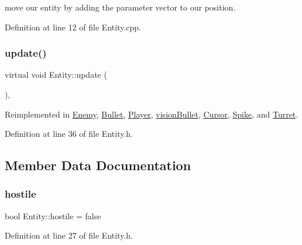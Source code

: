 move our entity by adding the parameter vector to our position. 



Definition at line 12 of file Entity.\+cpp.

\mbox{\label{class_entity_aed73e98b980b85833428c935cc1c69f8}} 
\subsubsection{\texorpdfstring{update()}{update()}}
{\footnotesize\ttfamily virtual void Entity\+::update (\begin{DoxyParamCaption}{ }\end{DoxyParamCaption})\hspace{0.3cm}{\ttfamily [inline]}, {\ttfamily [virtual]}}



Reimplemented in \hyperlink{class_enemy_aa70d742da02995011f1618acc9e303db}{Enemy}, \hyperlink{class_bullet_a32f4a0611fe2dd245fee955d14ca1f68}{Bullet}, \hyperlink{class_player_a6912bb6e48efb5845d59f0f4582827ef}{Player}, \hyperlink{classvision_bullet_a425ac17ace4a29879a9a204ffc29021d}{vision\+Bullet}, \hyperlink{class_cursor_a2450501ae27244acb089209436d5b112}{Cursor}, \hyperlink{class_spike_a5f1fc626e9f58f4a08a002c6d2549942}{Spike}, and \hyperlink{class_turret_aad95afd1118f42d424465c14ebb445c7}{Turret}.



Definition at line 36 of file Entity.\+h.



\subsection{Member Data Documentation}
\mbox{\label{class_entity_a22234c0796f8c2ca0d116495c83ecdd6}} 
\subsubsection{\texorpdfstring{hostile}{hostile}}
{\footnotesize\ttfamily bool Entity\+::hostile = false}



Definition at line 27 of file Entity.\+h.

\mbox{\label{class_entity_af1b0754c9d5f4afa73834b23c6437101}} 
